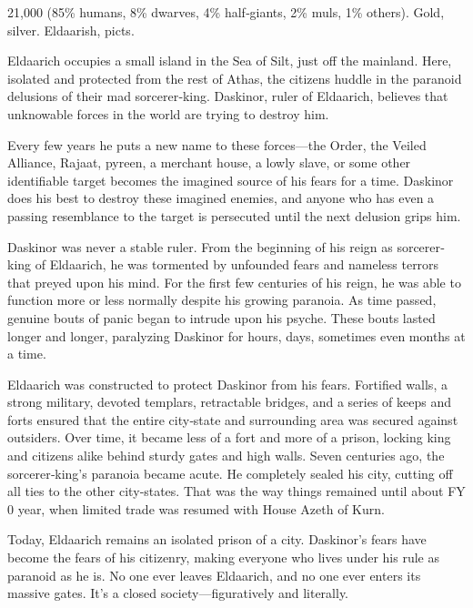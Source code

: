 {21,000 (85\% humans, 8\% dwarves, 4\% half‐giants, 2\% muls, 1\% others).}
{Gold, silver.}
{Eldaarish, picts.}
{
	Eldaarich occupies a small island in the Sea of Silt, just off the mainland. Here, isolated and protected from the rest of Athas, the citizens huddle in the paranoid delusions of their mad sorcerer‐king. Daskinor, ruler of Eldaarich, believes that unknowable forces in the world are trying to destroy him.

	Every few years he puts a new name to these forces---the Order, the Veiled Alliance, Rajaat, pyreen, a merchant house, a lowly slave, or some other identifiable target becomes the imagined source of his fears for a time. Daskinor does his best to destroy these imagined enemies, and anyone who has even a passing resemblance to the target is persecuted until the next delusion grips him.

	Daskinor was never a stable ruler. From the beginning of his reign as sorcerer‐king of Eldaarich, he was tormented by unfounded fears and nameless terrors that preyed upon his mind. For the first few centuries of his reign, he was able to function more or less normally despite his growing paranoia. As time passed, genuine bouts of panic began to intrude upon his psyche. These bouts lasted longer and longer, paralyzing Daskinor for hours, days, sometimes even months at a time.

	Eldaarich was constructed to protect Daskinor from his fears. Fortified walls, a strong military, devoted templars, retractable bridges, and a series of keeps and forts ensured that the entire city‐state and surrounding area was secured against outsiders. Over time, it became less of a fort and more of a prison, locking king and citizens alike behind sturdy gates and high walls. Seven centuries ago, the sorcerer‐king's paranoia became acute. He completely sealed his city, cutting off all ties to the other city‐states. That was the way things remained until about FY 0 year, when limited trade was resumed with House Azeth of Kurn.

	Today, Eldaarich remains an isolated prison of a city. Daskinor's fears have become the fears of his citizenry, making everyone who lives under his rule as paranoid as he is. No one ever leaves Eldaarich, and no one ever enters its massive gates. It's a closed society---figuratively and literally.
}
